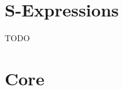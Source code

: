 \documentclass[acmsmall]{acmart}
\numberwithin{figure}{subsection}
\begin{document}


\newpage

\section{S-Expressions}

TODO



\section{Core}
\end{document}
